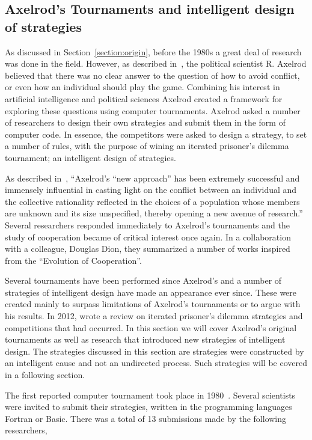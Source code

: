 \documentclass{article}
\theoremstyle{definition}
\begin{document}
\subsection{Axelrod's Tournaments and intelligent design of strategies}\label{subsection:intelligent_design}

As discussed in Section~\ref{section:origin}, before the 1980s a great deal of
research was done in the field. However, as described in~\cite{Axelrod2012}, the
political scientist R. Axelrod believed that there was no clear answer to the question
of how to avoid conflict, or even how an individual should play the game. Combining
his interest in artificial intelligence and political sciences Axelrod created a
framework for exploring these questions using computer tournaments.
Axelrod asked a number of researchers to design their own strategies and submit them
in the form of computer code. In essence, the competitors were asked to design a
strategy, to set a number of rules, with the purpose of wining an iterated prisoner's
dilemma tournament; an intelligent design of strategies.

As described in~\cite{Rapoport2015}, ``Axelrod's “new approach” has been extremely
successful and immensely influential in casting light on the conflict between an
individual and the collective rationality reflected in the choices of a population
whose members are unknown and its size unspecified, thereby opening a new avenue
of research.'' Several researchers responded immediately to Axelrod’s
tournaments and the study of cooperation became of critical interest once again.
In a collaboration~\cite{Axelrod1988} with a colleague, Douglas Dion,
they summarized a number of works inspired from the ``Evolution of Cooperation''.

Several tournaments have been performed since Axelrod's and a number of strategies
of intelligent design have made an appearance ever since. These were created mainly
to surpass limitations of Axelrod's tournaments or to argue with his results.
In 2012, \cite{Jurisic2012} wrote a review on iterated prisoner's dilemma strategies and
competitions that had occurred.
In this section we will cover Axelrod's original tournaments as well as 
research that introduced new strategies of intelligent design. The strategies discussed in
this section are strategies were constructed by an intelligent cause and not an
undirected process. Such strategies will be covered in a following
section.

The first reported computer tournament took place in 1980~\cite{Axelrod1980a}.
Several scientists were invited to submit their strategies, written in the
programming languages Fortran or Basic. There was a total of 13 submissions
made by the following researchers,
\end{document}
